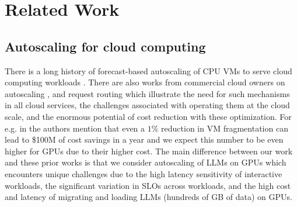 \begin{comment}
\begin{table*}[]
    \centering
    \resizebox{\textwidth}{!}{
        \begin{tabular}{c|ccccccc}
         \multirow{2}{*}{Work} & $>1$  & Startup and & Multiple  & Forecast & Varied Resource & Designed for & Infrastructure \\
         & Instance & Migration Delays & SLOs & Aware & Requirements & LLMs & Independent \\
         \hline
         vLLM & $\times$ & $\times$ & $\times$ & $\times$ & $\times$  & \checkmark & \checkmark \\
         Llumnix & \checkmark & $\times$ & $\times$ & $\times$ & $\times$  & \checkmark & $\times$ \\
         Zeal & \checkmark & $\times$ & $\times$ & $\times$ & $\times$  & \checkmark & \checkmark \\
         \hline
         \sys & \checkmark & \checkmark & \checkmark & \checkmark & \checkmark & \checkmark & \checkmark \\
        \end{tabular}
    }
    \caption{\kjnote{Comparison of \sys with current literature. Our work takes into account multiple architectures with diverse accelerator requirements having >1 instances while serving requests with varied SLOs and arrival patterns.}\textcolor{blue}{AP: remove the column, designed for LLMs. Better to align this table with the rest of narrative. for instance, align this with contribution section or other way around.}}
    \label{tab:related_works}
\end{table*}
\end{comment}
\section{Related Work }
\label{sec:related}

\subsection{Autoscaling for cloud computing} 
There is a long history of forecast-based autoscaling of CPU VMs to serve cloud computing workloads \cite{roy2011efficient,varshney2018autobot}. There are also works from commercial cloud owners on autoscaling \cite{hadary2020protean, rzadca2020autopilot}, and request routing \cite{saokar2023servicerouter} which illustrate the need for such mechanisms in all cloud services, the challenges associated with operating them at the cloud scale, and the enormous potential of cost reduction with these optimization. For e.g. in \cite{hadary2020protean} the authors mention that even a $1\%$ reduction in VM fragmentation can lead to \$100M of cost savings in a year and we expect this number to be even higher for GPUs due to their higher cost. The main difference between our work and these prior works is that we consider autoscaling of LLMs on GPUs  which encounters unique challenges due to the high latency sensitivity of interactive workloads, the significant variation in SLOs across workloads, and the high cost and latency of migrating and loading LLMs (hundreds of GB of data) on GPUs.

